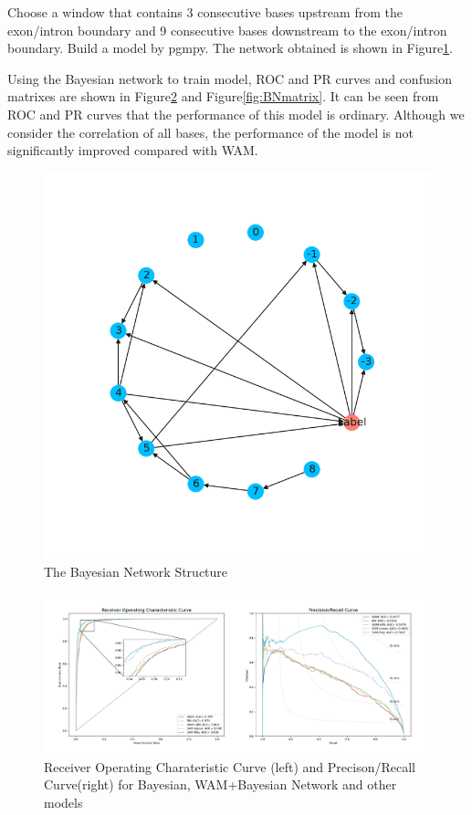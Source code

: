 \documentclass{gapd}
\begin{document}
Choose a window that contains 3 consecutive bases upstream from the
exon/intron boundary and 9 consecutive bases downstream to the
exon/intron boundary. Build a model by pgmpy. The network obtained is
shown in Figure\ref{fig:network}.


Using the Bayesian network to train model, ROC and PR curves and
confusion matrixes are shown in Figure\ref{fig:WBplot} and Figure\ref{fig:BNmatrix}. It can be seen from ROC
and PR curves that the performance of this model is ordinary. Although
we consider the correlation of all bases, the performance of the model
is not significantly improved compared with WAM.


\begin{figure}
  \centering
  \includegraphics[width=\columnwidth]{assets/network-20210609212835-4n4fayy.png}
  \caption{The Bayesian Network Structure}
  \label{fig:network}
\end{figure}


\begin{figure}
  \centering
  \includegraphics[width=1\linewidth]{assets/image-20210624154804096.png}
  \caption{Receiver Operating Charateristic Curve (left) and Precison/Recall
  Curve(right) for Bayesian, WAM+Bayesian Network and other models}
  \label{fig:WBplot}
\end{figure}
\end{document}

